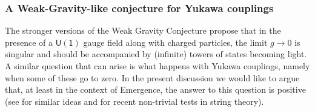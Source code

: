 	
	
\subsubsection{A Weak-Gravity-like conjecture for  Yukawa couplings}
\label{sss:WGCYukawa}

The stronger versions of the Weak Gravity Conjecture propose that in the presence of a $\mathsf{U(1)}$ gauge field along with charged particles, the limit $g\rightarrow 0$ is singular and should be accompanied by (infinite) towers of states becoming light. A similar question that can arise is what happens with Yukawa couplings, namely when some of these go to zero. In the present discussion we would like to argue that, at least in the context of Emergence, the answer to this question is positive (see \cite{Palti:2020tsy} for similar ideas and \cite{Casas:2024ttx} for recent non-trivial tests in string theory).
	
